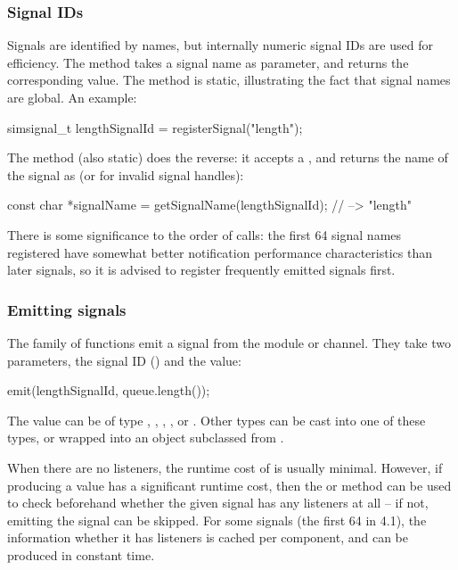 \subsubsection{Signal IDs}

Signals are identified by names, but internally numeric signal IDs are used
for efficiency. The  method takes a signal name as
parameter, and returns the corresponding  value.
The method is static, illustrating the fact that signal names are global.
An example:

\begin{cpp}
simsignal_t lengthSignalId = registerSignal("length");
\end{cpp}

The  method (also static) does the reverse:
it accepts a , and returns the name of the signal as
 (or  for invalid signal handles):

\begin{cpp}
const char *signalName = getSignalName(lengthSignalId); // --> "length"
\end{cpp}

\begin{note}
  There is some significance to the order of  calls: the
  first 64 signal names registered have somewhat better notification
  performance characteristics than later signals, so it is advised to
  register frequently emitted signals first.
\end{note}

\subsubsection{Emitting signals}

The  family of functions emit a signal from the module or
channel. They take two parameters, the signal ID () and
the value:

\begin{cpp}
emit(lengthSignalId, queue.length());
\end{cpp}

The value can be of type , , ,
, or . Other types can be cast into
one of these types, or wrapped into an object subclassed from .

When there are no listeners, the runtime cost of  is usually minimal.
However, if producing a value has a significant runtime cost, then the
 or  method can be used
to check beforehand whether the given signal has any listeners at all --
if not, emitting the signal can be skipped. For some signals (the first 64
in {\opp} 4.1), the information whether it has listeners is cached per
component, and can be produced in constant time.

